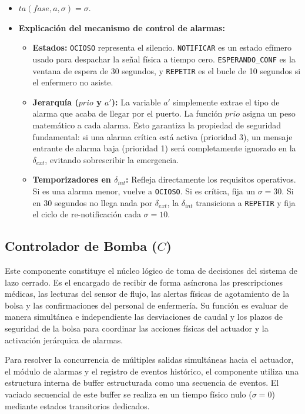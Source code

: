 \begin{itemize}
    \item $ta(fase, a, \sigma) = \sigma$.
    \item \textbf{Explicación del mecanismo de control de alarmas:}
    \begin{itemize}
        \item \textbf{Estados:} \texttt{OCIOSO} representa el silencio. \texttt{NOTIFICAR} es un estado efímero usado para despachar la señal física a tiempo cero. \texttt{ESPERANDO\_CONF} es la ventana de espera de 30 segundos, y \texttt{REPETIR} es el bucle de 10 segundos si el enfermero no asiste.
        \item \textbf{Jerarquía ($prio$ y $a'$):} La variable $a'$ simplemente extrae el tipo de alarma que acaba de llegar por el puerto. La función $prio$ asigna un peso matemático a cada alarma. Esto garantiza la propiedad de seguridad fundamental: si una alarma crítica está activa (prioridad 3), un mensaje entrante de alarma baja (prioridad 1) será completamente ignorado en la $\delta_{ext}$, evitando sobrescribir la emergencia.
        \item \textbf{Temporizadores en $\delta_{int}$:} Refleja directamente los requisitos operativos. Si es una alarma menor, vuelve a \texttt{OCIOSO}. Si es crítica, fija un $\sigma=30$. Si en 30 segundos no llega nada por $\delta_{ext}$, la $\delta_{int}$ transiciona a \texttt{REPETIR} y fija el ciclo de re-notificación cada $\sigma=10$.
    \end{itemize}
\end{itemize}

\subsection{Controlador de Bomba ($C$)}
Este componente constituye el núcleo lógico de toma de decisiones del sistema de lazo cerrado. Es el encargado de recibir de forma asíncrona las prescripciones médicas, las lecturas del sensor de flujo, las alertas físicas de agotamiento de la bolsa y las confirmaciones del personal de enfermería. Su función es evaluar de manera simultánea e independiente las desviaciones de caudal y los plazos de seguridad de la bolsa para coordinar las acciones físicas del actuador y la activación jerárquica de alarmas. 

Para resolver la concurrencia de múltiples salidas simultáneas hacia el actuador, el módulo de alarmas y el registro de eventos histórico, el componente utiliza una estructura interna de buffer estructurada como una secuencia de eventos. El vaciado secuencial de este buffer se realiza en un tiempo físico nulo ($\sigma = 0$) mediante estados transitorios dedicados.

